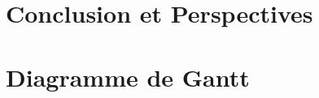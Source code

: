 \documentclass[a4paper,12pt,oneside,chapterprefix=true]{scrbook}
\begin{document}
  
  
  \chapter{Conclusion et Perspectives}
  
  
  
\appendix

\chapter{Diagramme de Gantt}\label{annexe-a}

\backmatter

\printglossary[type=\acronymtype]

\cleardoublepage
{}


  
\end{document}
